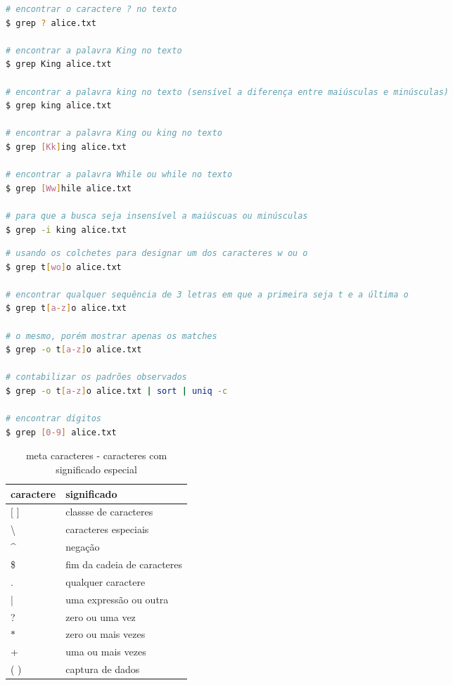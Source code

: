\begin{frame}
\framebreak

\begin{lstlisting}[language=bash, label=lst-grep-01, caption={Busca por um caractere ou uma sequência.}, postbreak=\mbox{$\hookrightarrow$\space}, basicstyle=\fontsize{8}{10}\selectfont\ttfamily]
# encontrar o caractere ? no texto
$ grep ? alice.txt

# encontrar a palavra King no texto
$ grep King alice.txt

# encontrar a palavra king no texto (sensível a diferença entre maiúsculas e minúsculas)
$ grep king alice.txt

# encontrar a palavra King ou king no texto
$ grep [Kk]ing alice.txt

# encontrar a palavra While ou while no texto
$ grep [Ww]hile alice.txt

# para que a busca seja insensível a maiúscuas ou minúsculas
$ grep -i king alice.txt
\end{lstlisting}

\framebreak

\begin{lstlisting}[language=bash, label=lst-grep-02, caption={O uso de colchetes representa uma disjunção de caracteres.}, postbreak=\mbox{$\hookrightarrow$\space}, basicstyle=\fontsize{8}{10}\selectfont\ttfamily]
# usando os colchetes para designar um dos caracteres w ou o
$ grep t[wo]o alice.txt

# encontrar qualquer sequência de 3 letras em que a primeira seja t e a última o
$ grep t[a-z]o alice.txt

# o mesmo, porém mostrar apenas os matches
$ grep -o t[a-z]o alice.txt

# contabilizar os padrões observados
$ grep -o t[a-z]o alice.txt | sort | uniq -c

# encontrar dígitos
$ grep [0-9] alice.txt
\end{lstlisting}

\framebreak

\begin{table}
\caption{meta caracteres - caracteres com significado especial}\label{tab-regex-metachar}
\begin{tabular}{ll}
caractere & significado \\
\midrule
$[$ $]$ &  classse de caracteres        \\ 
\textbackslash     &  caracteres especiais       \\ 
\^{}   &  negação                    \\ 
\$     &  fim da cadeia de caracteres\\ 
.      &  qualquer caractere         \\ 
|      &  uma expressão ou outra     \\ 
?      &  zero ou uma vez            \\ 
$\ast$ &  zero ou mais vezes         \\ 
+      &  uma ou mais vezes          \\ 
( )    &  captura de dados           \\ 
\end{tabular}
\end{table}


\end{frame}
